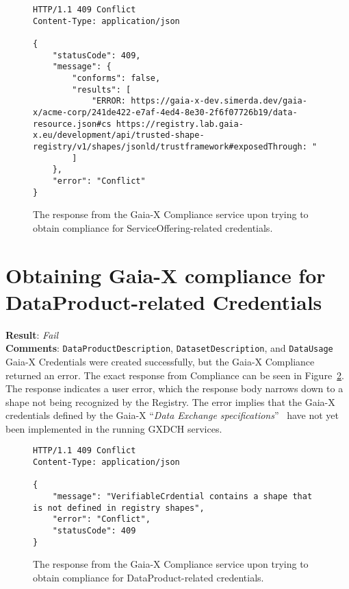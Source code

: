 \begin{figure}[h]
    \centering
    \begin{verbatim}
HTTP/1.1 409 Conflict
Content-Type: application/json

{
	"statusCode": 409,
	"message": {
		"conforms": false,
		"results": [
			"ERROR: https://gaia-x-dev.simerda.dev/gaia-x/acme-corp/241de422-e7af-4ed4-8e30-2f6f07726b19/data-resource.json#cs https://registry.lab.gaia-x.eu/development/api/trusted-shape-registry/v1/shapes/jsonld/trustframework#exposedThrough: "
		]
	},
	"error": "Conflict"
}
    \end{verbatim}
    \caption{The response from the Gaia-X Compliance service upon trying to obtain compliance for ServiceOffering-related credentials.}\label{fig:service_offering_compliance_response}
\end{figure}

\section[Data Product Compliance]{Obtaining Gaia-X compliance for DataProduct-related Credentials}\label{sec:obtaining-gaia-x-compliance-for-dataproduct-related-credentials}

\textbf{Result}: \textit{Fail}
\\
\textbf{Comments}: \texttt{DataProductDescription}, \texttt{DatasetDescription}, and \texttt{DataUsage} Gaia-X Credentials were created successfully, but the Gaia-X Compliance returned an error.
The exact response from Compliance can be seen in Figure~\ref{fig:data_product_compliance_response}.
The response indicates a user error, which the response body narrows down to a shape not being recognized by the Registry.
The error implies that the Gaia-X credentials defined by the Gaia-X ``\textit{Data Exchange specifications}''~\cite{gaiax_data_exchange_document} have not yet been implemented in the running GXDCH services.

\begin{figure}[h]
	\centering
	\begin{verbatim}
HTTP/1.1 409 Conflict
Content-Type: application/json

{
	"message": "VerifiableCrdential contains a shape that is not defined in registry shapes",
	"error": "Conflict",
	"statusCode": 409
}
	\end{verbatim}
	\caption{The response from the Gaia-X Compliance service upon trying to obtain compliance for DataProduct-related credentials.}\label{fig:data_product_compliance_response}
\end{figure}

